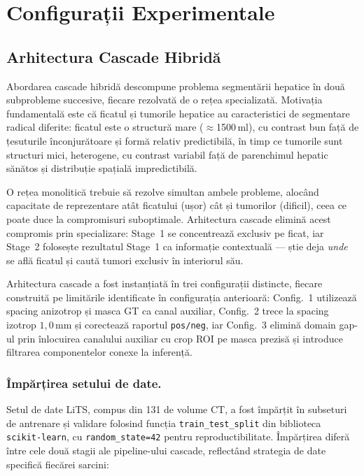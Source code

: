 \documentclass[12pt, a4paper]{report}
\begin{document}
\chapter{Configurații Experimentale}
\section{Arhitectura Cascade Hibridă}

Abordarea cascade hibridă descompune problema segmentării hepatice în două
subprobleme succesive, fiecare rezolvată de o rețea specializată.
Motivația fundamentală este că ficatul și tumorile hepatice au caracteristici de
segmentare radical diferite: ficatul este o structură mare ($\approx$1500\,ml),
cu contrast bun față de țesuturile înconjurătoare și formă relativ predictibilă,
în timp ce tumorile sunt structuri mici, heterogene, cu contrast variabil față de
parenchimul hepatic sănătos și distribuție spațială impredictibilă.

O rețea monolitică trebuie să rezolve simultan ambele probleme, alocând capacitate
de reprezentare atât ficatului (ușor) cât și tumorilor (dificil), ceea ce poate duce
la compromisuri suboptimale. Arhitectura cascade elimină acest compromis prin
specializare: Stage~1 se concentrează exclusiv pe ficat, iar Stage~2 folosește
rezultatul Stage~1 ca informație contextuală — știe deja \textit{unde} se află ficatul
și caută tumori exclusiv în interiorul său.





 

Arhitectura cascade a fost instanțiată în trei configurații distincte, fiecare
construită pe limitările identificate în configurația anterioară:
Config.~1 utilizează spacing anizotrop și masca GT ca canal auxiliar,
Config.~2 trece la spacing izotrop $1{,}0$\,mm și corectează raportul
\texttt{pos/neg}, iar Config.~3 elimină domain gap-ul prin înlocuirea
canalului auxiliar cu crop ROI pe masca prezisă și introduce filtrarea
componentelor conexe la inferență.


\subsection{Împărțirea setului de date.}
Setul de date LiTS, compus din 131 de volume CT, a fost împărțit
în subseturi de antrenare și validare folosind funcția
\texttt{train\_test\_split} din biblioteca \texttt{scikit-learn},
cu \texttt{random\_state=42} pentru reproductibilitate.
Împărțirea diferă între cele două stagii ale pipeline-ului cascade,
reflectând strategia de date specifică fiecărei sarcini:
\end{document}
